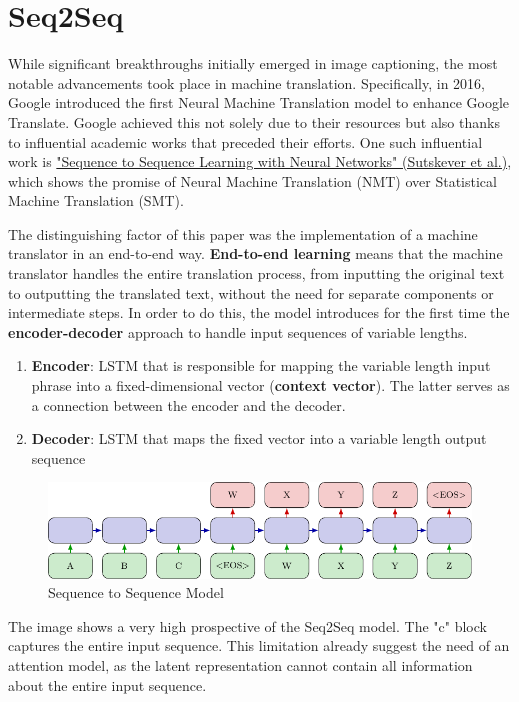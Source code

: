 \section{Seq2Seq}

While significant breakthroughs initially emerged in image captioning, the most notable advancements took place in machine translation. Specifically, in 2016, Google introduced the first Neural Machine Translation model to enhance Google Translate.  Google achieved this not solely due to their resources but also thanks to influential academic works that preceded their efforts. One such influential work is  \href{https://arxiv.org/pdf/1409.3215}{"Sequence to Sequence Learning with Neural Networks" (Sutskever et al.)}, which shows the promise of Neural Machine Translation (NMT) over Statistical Machine Translation (SMT).

The distinguishing factor of this paper was the implementation of a machine translator in an end-to-end way. \textbf{End-to-end learning} means that the machine translator handles the entire translation process, from inputting the original text to outputting the translated text, without the need for separate components or intermediate steps. In order to do this, the model introduces for the first time the \textbf{encoder-decoder} approach to handle input sequences of variable lengths. 

\begin{enumerate}
    \item \textbf{Encoder}: LSTM that is responsible for mapping the variable length input phrase into a fixed-dimensional vector (\textbf{context vector}). The latter serves as a connection between the encoder and the decoder.
    \item \textbf{Decoder}: LSTM that maps the fixed vector into a variable length output sequence
\end{enumerate}

\begin{figure}[!htbp]
    \centering
    \includegraphics[width=\linewidth]{tikz/chapter7 - Seq2Seq.pdf}
    \caption{Sequence to Sequence Model}
\end{figure}

The image shows a very high prospective of the Seq2Seq model. The "c" block captures the entire input sequence. This limitation already suggest the need of an attention model, as the latent representation cannot contain all information about the entire input sequence.

